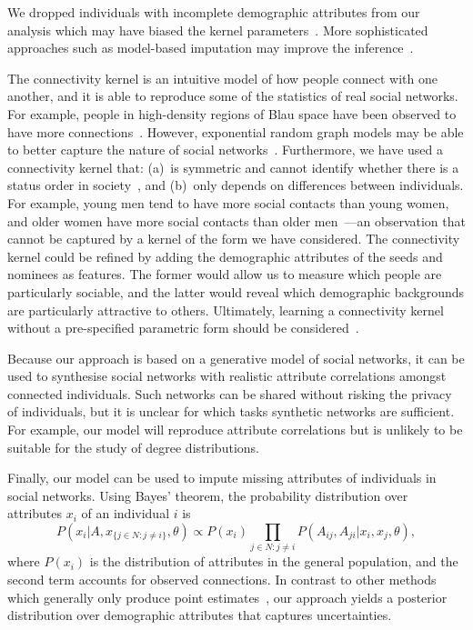 \documentclass{scrartcl}
\newcommand{\population}{N}
\begin{document}
We dropped individuals with incomplete demographic attributes from our analysis which may have biased the kernel parameters~\cite{Rubin1976}. %
More sophisticated approaches such as model-based imputation may improve the inference~\cite{Pigott2001}.

The connectivity kernel is an intuitive model of how people connect with one another, and it is able to reproduce some of the statistics of real social networks. For example, people in high-density regions of Blau space have been observed to have more connections~\cite{Currarini2009}. However, exponential random graph models may be able to better capture the nature of social networks~\cite{Wimmer2010}. Furthermore, we have used a connectivity kernel that: (a)~is symmetric and cannot identify whether there is a status order in society~\cite{Chan2004,Ball2013}, and (b)~only depends on  differences between individuals. For example, young men tend to have more social contacts than young women, and older women have more social contacts than older men~\cite{Bhattacharya2016}---an observation that cannot be captured by a kernel of the form we have considered. The connectivity kernel could be refined by adding the demographic attributes of the seeds and nominees as features. The former would allow us to measure which people are particularly sociable, and the latter would reveal which demographic backgrounds are particularly attractive to others. Ultimately, learning a connectivity kernel without a pre-specified parametric form should be considered~\cite{Frolich2006}.

Because our approach is based on a generative model of social networks, it can be used to synthesise social networks with realistic attribute correlations amongst connected individuals. Such networks can be shared without risking the privacy of individuals, but it is unclear for which tasks synthetic networks are sufficient. For example, our model will reproduce attribute correlations but is unlikely to be suitable for the study of degree distributions.

Finally, our model can be used to impute missing attributes of individuals in social networks. Using Bayes' theorem, the probability distribution over attributes $x_i$ of an individual $i$ is
\[
    P\left(x_i|A, x_{\{j\in \population:j \neq i\}}, \theta\right) \propto P(x_i) \prod_{j\in\population: j\neq i} P(A_{ij}, A_{ji}|x_i, x_j, \theta),
\]
where $P(x_i)$ is the distribution of attributes in the general population, and the second term accounts for observed connections. In contrast to other methods which generally only produce point estimates~\cite{Wang2013, Backstrom2010}, our approach yields a posterior distribution over demographic attributes that captures uncertainties.
\end{document}
